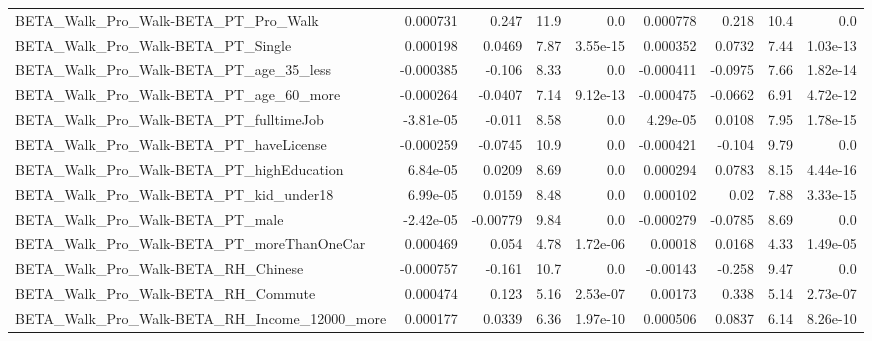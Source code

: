 \begin{tabular}{lrrrrrrrr}
BETA\_Walk\_Pro\_Walk-BETA\_PT\_Pro\_Walk                &    0.000731 &        0.247 &      11.9 &      0.0 &   0.000778 &       0.218 &         10.4 &           0.0 \\
BETA\_Walk\_Pro\_Walk-BETA\_PT\_Single                  &    0.000198 &       0.0469 &      7.87 & 3.55e-15 &   0.000352 &      0.0732 &         7.44 &      1.03e-13 \\
BETA\_Walk\_Pro\_Walk-BETA\_PT\_age\_35\_less             &   -0.000385 &       -0.106 &      8.33 &      0.0 &  -0.000411 &     -0.0975 &         7.66 &      1.82e-14 \\
BETA\_Walk\_Pro\_Walk-BETA\_PT\_age\_60\_more             &   -0.000264 &      -0.0407 &      7.14 & 9.12e-13 &  -0.000475 &     -0.0662 &         6.91 &      4.72e-12 \\
BETA\_Walk\_Pro\_Walk-BETA\_PT\_fulltimeJob             &   -3.81e-05 &       -0.011 &      8.58 &      0.0 &   4.29e-05 &      0.0108 &         7.95 &      1.78e-15 \\
BETA\_Walk\_Pro\_Walk-BETA\_PT\_haveLicense             &   -0.000259 &      -0.0745 &      10.9 &      0.0 &  -0.000421 &      -0.104 &         9.79 &           0.0 \\
BETA\_Walk\_Pro\_Walk-BETA\_PT\_highEducation           &    6.84e-05 &       0.0209 &      8.69 &      0.0 &   0.000294 &      0.0783 &         8.15 &      4.44e-16 \\
BETA\_Walk\_Pro\_Walk-BETA\_PT\_kid\_under18             &    6.99e-05 &       0.0159 &      8.48 &      0.0 &   0.000102 &        0.02 &         7.88 &      3.33e-15 \\
BETA\_Walk\_Pro\_Walk-BETA\_PT\_male                    &   -2.42e-05 &     -0.00779 &      9.84 &      0.0 &  -0.000279 &     -0.0785 &         8.69 &           0.0 \\
BETA\_Walk\_Pro\_Walk-BETA\_PT\_moreThanOneCar          &    0.000469 &        0.054 &      4.78 & 1.72e-06 &    0.00018 &      0.0168 &         4.33 &      1.49e-05 \\
BETA\_Walk\_Pro\_Walk-BETA\_RH\_Chinese                 &   -0.000757 &       -0.161 &      10.7 &      0.0 &   -0.00143 &      -0.258 &         9.47 &           0.0 \\
BETA\_Walk\_Pro\_Walk-BETA\_RH\_Commute                 &    0.000474 &        0.123 &      5.16 & 2.53e-07 &    0.00173 &       0.338 &         5.14 &      2.73e-07 \\
BETA\_Walk\_Pro\_Walk-BETA\_RH\_Income\_12000\_more       &    0.000177 &       0.0339 &      6.36 & 1.97e-10 &   0.000506 &      0.0837 &         6.14 &      8.26e-10 \\

\end{tabular}
